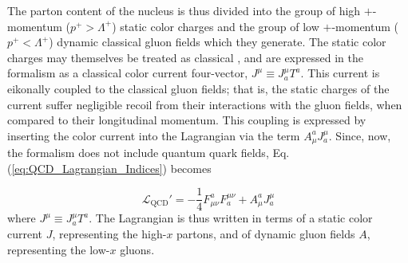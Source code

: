 
The parton content of the nucleus is thus divided into the group of high $+$-momentum ($p^+ > \Lambda^+$) static color charges and the group of low $+$-momentum ($p^+ < \Lambda^+$) dynamic classical gluon fields which they generate. The static color charges may themselves be treated as classical \citep{Albacete_2014,McLerran_1994_classic_source}, and are expressed in the formalism as a classical color current four-vector, $J^\mu \equiv J^\mu_a T^a$. This current is eikonally coupled to the classical gluon fields; that is, the static charges of the current suffer negligible recoil from their interactions with the gluon fields, when compared to their longitudinal momentum. \cite{Gelis_2010} This coupling is expressed by inserting the color current into the Lagrangian via the term $A_\mu^a J^\mu_a$. Since, now, the formalism does not include quantum quark fields, Eq.  (\ref{eq:QCD_Lagrangian_Indices}) becomes 

\begin{equation}
	\mathcal{L}_\text{QCD}'  =  - \frac{1}{4} F_{\mu \nu}^a F^{\mu \nu}_a + A_\mu^a J^\mu_a 
	\label{eq:QCD_Lag_Current_indices}
\end{equation}
where $J^\mu \equiv J^\mu_a T^a$. The Lagrangian is thus written in terms of a static color current $J$, representing the high-$x$ partons, and of dynamic gluon fields $A$, representing the low-$x$ gluons.

